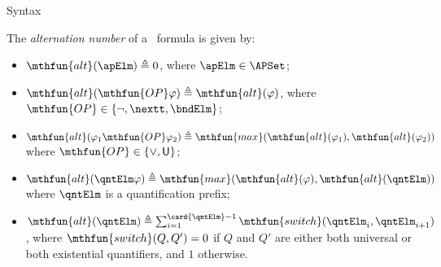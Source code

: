 \begin{subsection}{Syntax}
		
		                \begin{definition}%
		                \label{def:sl(freeagvar)}
		                        The %
		                        \emph{alternation number} of a \NGGSLT\
		                        formula is given by:
		                        \begin{itemize}
		                                \item
		                                $\mthfun{alt}(\apElm) \defeq 0$, where $\apElm \in \APSet$;
		                                \vspace{-0.35em}
		                                \item
		                                $\mthfun{alt}(\mthfun{OP}\varphi) \defeq \mthfun{alt}(\varphi)$,
		                                where $\mthfun{OP} \in \{ \neg, \nextt, \bndElm \}$;
		                                \vspace{-0.35em}
		                                \item
		                                $\mthfun{alt}(\varphi_{1} \mthfun{OP} \varphi_{2}) \defeq 
		                                \mthfun{max}(\mthfun{alt}(\varphi_{1}), \mthfun{alt}(\varphi_{2}))$
		                                where $\mthfun{OP} \in \{ \vee, \until \}$;
		                                \vspace{-0.35em}
		                                \item
		                                $\mthfun{alt}(\qntElm \varphi) \defeq 
		                                \mthfun{max}(\mthfun{alt}(\varphi), \mthfun{alt}(\qntElm))$ where $\qntElm$ is a quantification prefix;
		                                \vspace{-0.35em}
		                                \item
		                                $\mthfun{alt}(\qntElm) \defeq 
		                                \sum_{i = 1}^{\card{\qntElm}-1} \mthfun{switch}(\qntElm_i,
		                                \qntElm_{i+1})$, where $\mthfun{switch}(Q,Q') = 
		                                0$ if $Q$ and $Q'$ are either both universal or both existential quantifiers, and $1$ otherwise.
		                        \end{itemize}
		                \end{definition}
		

\end{subsection}
